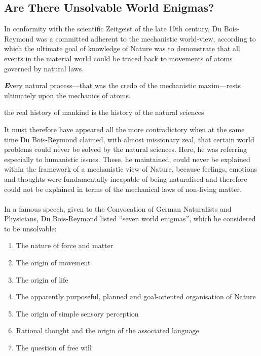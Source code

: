 \documentclass[10pt]{article}
\newenvironment{callout}
	{\begin{calloutbox}\color{charcoal}\textbf\textit}
	{\end{calloutbox}}
\begin{document}
        \subsection{Are There Unsolvable World Enigmas?}
            \indent In conformity with the scientific Zeitgeist of the late 19th century, Du Bois-Reymond was a committed adherent to the mechanistic world-view, according to which the ultimate goal of knowledge of Nature was to demonstrate that all events in the material world could be traced back to movements of atoms governed by natural laws.
            \begin{callout}
                Every natural process—that was the credo of the mechanistic maxim—rests ultimately upon the mechanics of atoms.
            \end{callout}
            \begin{qt}
                the real history of mankind is the history of the natural sciences
            \end{qt}
            \indent It must therefore have appeared all the more contradictory when at the same time Du Bois-Reymond claimed, with almost missionary zeal, that certain world problems could never be solved by the natural sciences. Here, he was referring especially to humanistic issues. These, he maintained, could never be explained within the framework of a mechanistic view of Nature, because feelings, emotions and thoughts were fundamentally incapable of being naturalised and therefore could not be explained in terms of the mechanical laws of non-living matter.
            \\
            \\
            \indent In a famous speech, given to the Convocation of German Naturalists and Physicians, Du Bois-Reymond listed “seven world enigmas”, which he considered to be unsolvable:
            \begin{enumerate}
                \item The nature of force and matter
                \item The origin of movement 
                \item The origin of life
                \item The apparently purposeful, planned and goal-oriented organisation of Nature 
                \item The origin of simple sensory perception 
                \item Rational thought and the origin of the associated language
                \item The question of free will
            \end{enumerate}
\end{document}
